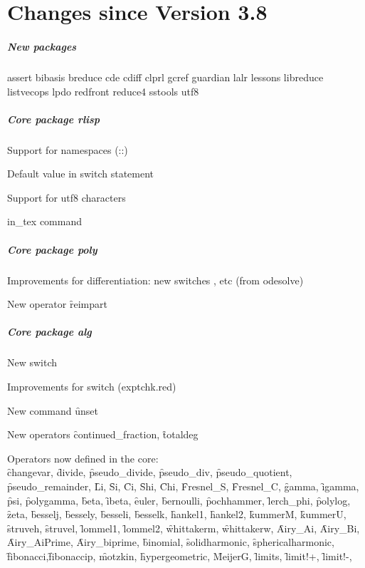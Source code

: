 \chapter{Changes since Version 3.8}

\paragraph*{New packages}

assert
bibasis
breduce
cde
cdiff
clprl
gcref
guardian
lalr
lessons
libreduce
listvecops
lpdo
redfront
reduce4
sstools
utf8

\paragraph*{Core package rlisp}

Support for namespaces (::)

Default value in switch statement

Support for utf8 characters

in\_tex command

\paragraph*{Core package poly}

Improvements for differentiation: new switches ,  etc
(from odesolve)

New operator \f{reimpart}

\paragraph*{Core package alg}

New switch 

Improvements for switch  (exptchk.red)

New command \f{unset}

New operators \f{continued\_fraction}, \f{totaldeg}

Operators now defined in the \REDUCE core:\\
\f{changevar},
\f{divide}, \f{pseudo\_divide}, \f{pseudo\_div}, \f{pseudo\_quotient}, \f{pseudo\_remainder},
\f{Li}, \f{Si}, \f{Ci}, \f{Shi}, \f{Chi},
\f{Fresnel\_S}, \f{Fresnel\_C},
\f{gamma}, \f{igamma}, \f{psi}, \f{polygamma}, \f{beta}, \f{ibeta},
\f{euler},
\f{bernoulli}, \f{pochhammer}, \f{lerch\_phi}, \f{polylog}, \f{zeta}, 
\f{besselj},
\f{bessely},
\f{besseli},
\f{besselk},
\f{hankel1},
\f{hankel2},
\f{kummerM},
\f{kummerU},
\f{struveh},
\f{struvel},
\f{lommel1},
\f{lommel2},
\f{whittakerm},
\f{whittakerw},
\f{Airy\_Ai},
\f{Airy\_Bi},
\f{Airy\_AiPrime},
\f{Airy\_biprime},
\f{binomial},
\f{solidharmonic},
\f{sphericalharmonic},
\f{fibonacci},\f{fibonaccip},
\f{motzkin},
\f{hypergeometric}, \f{MeijerG},
\f{limits}, \f{limit!+}, \f{limit!-},


